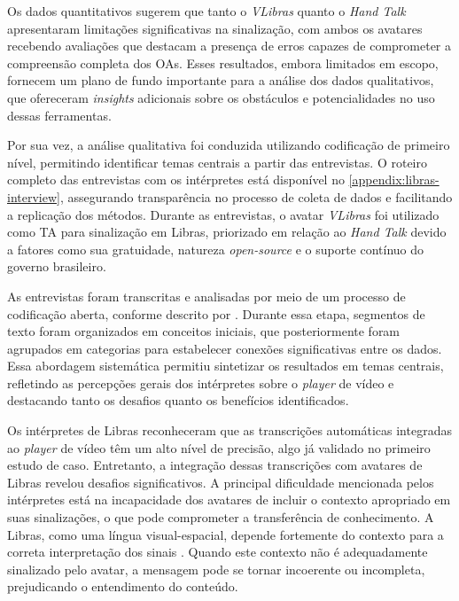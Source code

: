 Os dados quantitativos sugerem que tanto o \textit{VLibras} quanto o \textit{Hand Talk} apresentaram limitações significativas na sinalização, com ambos os avatares recebendo avaliações que destacam a presença de erros capazes de comprometer a compreensão completa dos OAs. Esses resultados, embora limitados em escopo, fornecem um plano de fundo importante para a análise dos dados qualitativos, que ofereceram \textit{insights} adicionais sobre os obstáculos e potencialidades no uso dessas ferramentas.

Por sua vez, a análise qualitativa foi conduzida utilizando codificação de primeiro nível, permitindo identificar temas centrais a partir das entrevistas. O roteiro completo das entrevistas com os intérpretes está disponível no \autoref{appendix:libras-interview}, assegurando transparência no processo de coleta de dados e facilitando a replicação dos métodos. Durante as entrevistas, o avatar \textit{VLibras} foi utilizado como TA para sinalização em Libras, priorizado em relação ao \textit{Hand Talk} devido a fatores como sua gratuidade, natureza \textit{open-source} e o suporte contínuo do governo brasileiro.

As entrevistas foram transcritas e analisadas por meio de um processo de codificação aberta, conforme descrito por . Durante essa etapa, segmentos de texto foram organizados em conceitos iniciais, que posteriormente foram agrupados em categorias para estabelecer conexões significativas entre os dados. Essa abordagem sistemática permitiu sintetizar os resultados em temas centrais, refletindo as percepções gerais dos intérpretes sobre o \textit{player} de vídeo e destacando tanto os desafios quanto os benefícios identificados.

Os intérpretes de Libras reconheceram que as transcrições automáticas integradas ao \textit{player} de vídeo têm um alto nível de precisão, algo já validado no primeiro estudo de caso. Entretanto, a integração dessas transcrições com avatares de Libras revelou desafios significativos. A principal dificuldade mencionada pelos intérpretes está na incapacidade dos avatares de incluir o contexto apropriado em suas sinalizações, o que pode comprometer a transferência de conhecimento. A Libras, como uma língua visual-espacial, depende fortemente do contexto para a correta interpretação dos sinais \cite{Quadros2017, Quadros2019, Honora2021}. Quando este contexto não é adequadamente sinalizado pelo avatar, a mensagem pode se tornar incoerente ou incompleta, prejudicando o entendimento do conteúdo.

